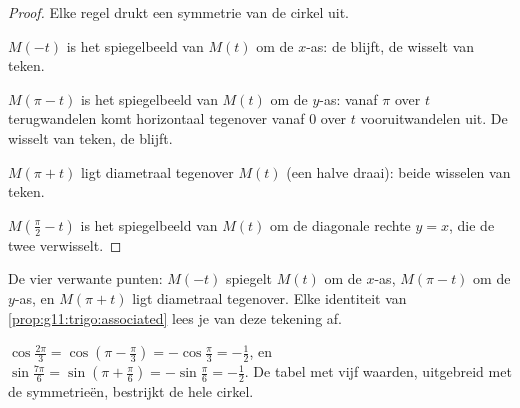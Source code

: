 \begin{proof}
Elke regel drukt een symmetrie van de cirkel uit.

$M(-t)$ is het spiegelbeeld van $M(t)$ om de $x$-as: de  blijft, de
 wisselt van teken.

$M(\pi - t)$ is het spiegelbeeld van $M(t)$ om de $y$-as: vanaf $\pi$ over
$t$ terugwandelen komt horizontaal tegenover vanaf $0$ over $t$
vooruitwandelen uit. De  wisselt van teken, de  blijft.

$M(\pi + t)$ ligt diametraal tegenover $M(t)$ (een halve draai): beide
 wisselen van teken.

$M\!\left(\frac\pi2 - t\right)$ is het spiegelbeeld van $M(t)$ om de
diagonale rechte $y = x$, die de twee  verwisselt.
\end{proof}

\begin{omfigure}

{\small De vier verwante punten: $M(-t)$ spiegelt $M(t)$ om de $x$-as,
$M(\pi - t)$ om de $y$-as, en $M(\pi + t)$ ligt diametraal tegenover. Elke
identiteit van \cref{prop:g11:trigo:associated} lees je van deze tekening
af.}
\end{omfigure}

\begin{example}
$\cos\frac{2\pi}{3} = \cos\left(\pi - \frac\pi3\right) = -\cos\frac\pi3
= -\frac12$, en $\sin\frac{7\pi}{6} = \sin\left(\pi + \frac\pi6\right)
= -\sin\frac\pi6 = -\frac12$. De tabel met vijf waarden, uitgebreid met de
symmetrieën, bestrijkt de hele cirkel.
\end{example}

